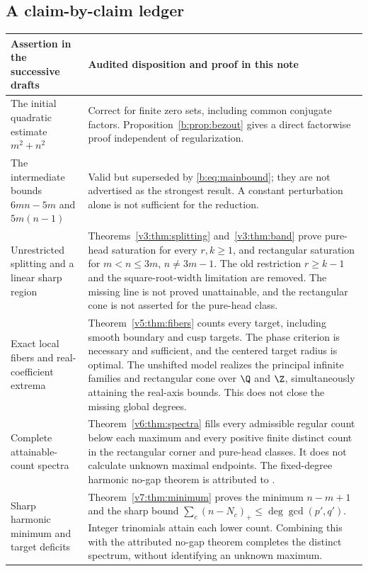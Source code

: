 \documentclass[UTF8,11pt]{ctexart}
\theoremstyle{definition}
\numberwithin{equation}{section}
\begin{document}
\subsection{A claim-by-claim ledger}
\small
\begin{longtable}{@{}>{\raggedright\arraybackslash}p{}>{\raggedright\arraybackslash}p{}@{}}
\toprule
Assertion in the successive drafts & Audited disposition and proof in this note \\
\midrule
\endhead
The initial quadratic estimate $m^2+n^2$ & Correct for finite zero sets, including common conjugate factors. Proposition~\ref{b:prop:bezout} gives a direct factorwise proof independent of regularization. \\
The intermediate bounds $6mn-5m$ and $5m(n-1)$ & Valid but superseded by \eqref{b:eq:mainbound}; they are not advertised as the strongest result. A constant perturbation alone is not sufficient for the reduction. \\
Unrestricted splitting and a linear sharp region & Theorems~\ref{v3:thm:splitting} and~\ref{v3:thm:band} prove pure-head saturation for every $r,k\ge1$, and rectangular saturation for $m<n\le3m$, $n\ne3m-1$. The old restriction $r\ge k-1$ and the square-root-width limitation are removed. The missing line is not proved unattainable, and the rectangular cone is not asserted for the pure-head class. \\
Exact local fibers and real-coefficient extrema & Theorem~\ref{v5:thm:fibers} counts every target, including smooth boundary and cusp targets. The phase criterion is necessary and sufficient, and the centered target radius is optimal. The unshifted model realizes the principal infinite families and rectangular cone over $\Q$ and $\Z$, simultaneously attaining the real-axis bounds. This does not close the missing global degrees. \\
Complete attainable-count spectra & Theorem~\ref{v6:thm:spectra} fills every admissible regular count below each maximum and every positive finite distinct count in the rectangular corner and pure-head classes. It does not calculate unknown maximal endpoints. The fixed-degree harmonic no-gap theorem is attributed to \cite{SZ21}. \\
Sharp harmonic minimum and target deficits & Theorem~\ref{v7:thm:minimum} proves the minimum $n-m+1$ and the sharp bound $\sum_c(n-N_c)_+\le\deg\gcd(p',q')$. Integer trinomials attain each lower count. Combining this with the attributed no-gap theorem completes the distinct spectrum, without identifying an unknown maximum. \\

\end{longtable}
\end{document}

